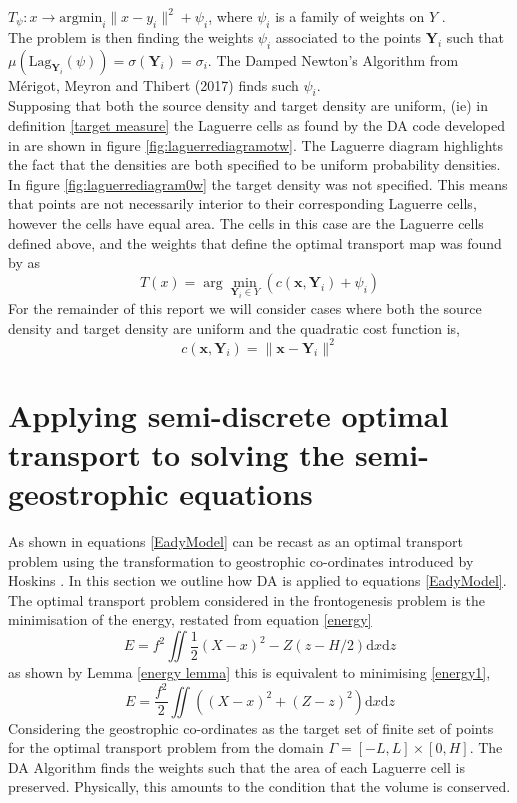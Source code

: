 $T_\psi: x \rightarrow \text{argmin}_i\| x - y_i \|^2 + \psi_i$, where $\psi_i$ is a family of weights on $Y$ \cite{Merigot2017}.\\
\linebreak
 The problem is then finding the weights $\psi_i$ associated to the points $\bm{Y}_i$ such that $\mu (\text{Lag}_{\bm{Y}_i}(\psi)) = \sigma(\bm{Y}_i) = \sigma_i$. The Damped Newton's Algorithm from M\'{e}rigot, Meyron and Thibert (2017) \cite{Merigot2017} finds such $\psi_i$.
 \\
 \linebreak 
 Supposing that both the source density and target density are uniform, (ie) in definition \ref{target measure} the Laguerre cells as found by the DA code developed in \cite{Merigot2017} are shown in figure \ref{fig:laguerrediagramotw}. The Laguerre diagram highlights the fact that the densities are both specified to be uniform probability densities. In figure \ref{fig:laguerrediagram0w} the target density was not specified. This means that points are not necessarily interior to their corresponding Laguerre cells, however the cells have equal area. The cells in this case are the Laguerre cells defined above, and the weights that define the optimal transport map was found by \cite{Merigot2017} as
 \begin{equation*}
 T(x) = \arg\min_{\bm{Y}_i\in Y}\left(c(\bm{x},\bm{Y}_i) + \psi_i\right)
 \end{equation*}
For the remainder of this report we will consider cases where both the source density and target density are uniform and the quadratic cost function is,
\begin{equation*}
	c(\bm{x},\bm{Y}_i) = \| \bm{x} - \bm{Y}_i \|^2
\end{equation*}
\section{Applying semi-discrete optimal transport to solving the semi-geostrophic equations}
As shown in \cite{Cullen2006a} equations \ref{EadyModel} can be recast as an optimal transport problem using the transformation to geostrophic co-ordinates introduced by Hoskins \cite{Hoskins1975}. In this section we outline how DA is applied to equations \ref{EadyModel}.
\\
\linebreak
The optimal transport problem considered in the frontogenesis problem is the minimisation of the energy, restated from equation \ref{energy}
\begin{equation}
E = f^2 \iint \frac{1}{2}\left(X-x\right)^2 - Z\left(z - H/2\right)\textrm{d}x\textrm{d}z
\end{equation}
as shown by Lemma \ref{energy lemma} this is equivalent to minimising \ref{energy1},
\begin{equation}
E = \frac{f^2}{2} \iint \left(\left(X-x\right)^2 + \left(Z - z\right)^2\right)\textrm{d}x\textrm{d}z
\end{equation}
Considering the geostrophic co-ordinates as the target set of finite set of points for the optimal transport problem from the domain $\Gamma = [-L,L] \times [0,H]$. The DA Algorithm finds the weights such that the area of each Laguerre cell is preserved. Physically, this amounts to the condition that the volume is conserved.
